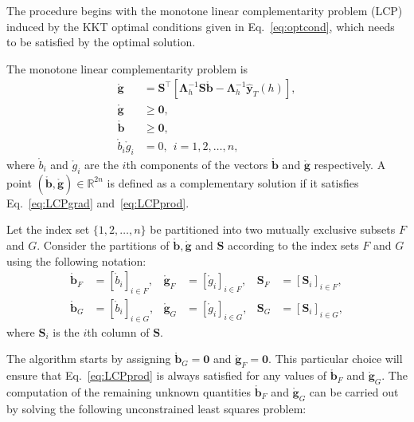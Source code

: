 \documentclass[twocolumn]{svjour3}
\begin{document}
The procedure begins with the monotone linear complementarity problem (LCP) induced by the KKT optimal conditions given in Eq.~\eqref{eq:optcond}, which needs to be satisfied by the optimal solution.

The monotone linear complementarity problem is
\begin{align}
\mathring{\bm{g}}            & = \bm{S}^\top[\bm{\Lambda}_{h}^{-1}\bm{S}\mathring{\bm{b}} - \bm{\Lambda}_{h}^{-1}\hat{\bm{y}}_{T}(h)],\label{eq:LCPgrad} \\
\mathring{\bm{g}}            & \geq \bm{0}, \label{eq:LCPg}                                                                                          \\
\mathring{\bm{b}}            & \geq \bm{0}, \label{eq:LCPb}                                                                                          \\
\mathring{b}_{i}\mathring{g}_{i} & = 0, \ \ i = 1, 2, \dots, n\label{eq:LCPprod},
\end{align}
where $\mathring{b}_{i}$ and $\mathring{g}_{i}$ are the $i$th components of the vectors $\mathring{\bm{b}}$ and $\mathring{\bm{g}}$ respectively. A point $(\mathring{\bm{b}}, \mathring{\bm{g}}) \in \mathbb{R}^{2n}$ is defined as a complementary solution if it satisfies Eq.~\eqref{eq:LCPgrad} and~\eqref{eq:LCPprod}.

Let the index set $\{1, 2, \dots, n\}$ be partitioned into two mutually exclusive subsets $F$ and $G$. Consider the partitions of $\mathring{\bm{b}}, \mathring{\bm{g}}$ and $\bm{S}$ according to the index sets $F$ and $G$ using the following notation:
\begin{align*}
\mathring{\bm{b}}_{F} & = [\mathring{b}_{i}]_{i \in F}, & \mathring{\bm{g}}_{F} & = [\mathring{g}_{i}]_{i \in F}, & \bm{S}_{F} & = [\bm{S}_{i}]_{i \in F}, \\
\mathring{\bm{b}}_{G} & = [\mathring{b}_{i}]_{i \in G}, & \mathring{\bm{g}}_{G} & = [\mathring{g}_{i}]_{i \in G}, & \bm{S}_{G} & = [\bm{S}_{i}]_{i \in G},
\end{align*}
where $\bm{S}_{i}$ is the $i$th column of $\bm{S}$.

The algorithm starts by assigning $\mathring{\bm{b}}_{G} = \bm{0}$ and $\mathring{\bm{g}}_{F} = \bm{0}$. This particular choice will ensure that Eq.~\eqref{eq:LCPprod} is always satisfied for any values of $\mathring{\bm{b}}_{F}$ and $\mathring{\bm{g}}_{G}$.
The computation of the remaining unknown quantities $\mathring{\bm{b}}_{F}$ and $\mathring{\bm{g}}_{G}$ can be carried out by solving the following unconstrained least squares problem:
\end{document}
